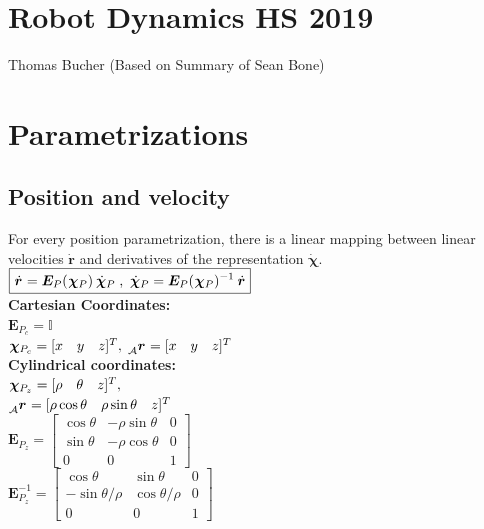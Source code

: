 \documentclass[a4paper, 8pt]{extarticle}
\newcommand{\mvec}[3]{  \prescript{}{\mathcal{#1}}{\bm{#2}}  _{#3} }
\newcommand{\mdvec}[3]{ \prescript{}{\mathcal{#1}}{\dot{\bm #2}} _{#3} }
\begin{document}
\begin{multicols*}{3}


\section*{Robot Dynamics HS 2019}
{\small Thomas Bucher (Based on Summary of Sean Bone)}\\
\section{Parametrizations}
\subsection{Position and velocity}
For every position parametrization, there is a linear mapping between linear velocities $\dot{\bm{r}}$ and derivatives of the representation $\dot{\bm{\chi}}$.\\
$\boxed{\mdvec{}{r}{} = \bm{E}_P(\mvec{}{\chi}{P})\mdvec{}{\chi}{P}\; , \; \mdvec{}{\chi}{P} = \bm{E}_P(\mvec{}{\chi}{P})^{-1}\mdvec{}{r}{}}$\\

\noindent\textbf{Cartesian Coordinates:}\\
$\bm{E}_{P_c} = \mathbb{I}$\\
$\mvec{}{\chi}{P_c} = [x \quad y \quad z]^T,\; \mvec{A}{r}{} = [x \quad y \quad z]^T$\\

\noindent\textbf{Cylindrical coordinates:}\\
$\mvec{}{\chi}{P_z} = [\rho \quad \theta \quad z]^T,$\\
$\mvec{A}{r}{} = [\rho\cos\theta \quad \rho\sin\theta \quad z]^T$\\
$\bm E_{P_z} = 
\left[\begin{smallmatrix} 
\cos\theta  &  -\rho\sin\theta  &  0\\
\sin\theta  &  -\rho\cos\theta  &  0\\
0 & 0 & 1
\end{smallmatrix}\right]$\\
$\bm E_{P_z}^{-1} = 
\left[\begin{smallmatrix} 
\cos\theta  &  \sin\theta  &  0\\
-\sin\theta/\rho  &  \cos\theta/\rho  &  0\\
0 & 0 & 1
\end{smallmatrix}\right]$\\


\end{multicols*}
\end{document}

